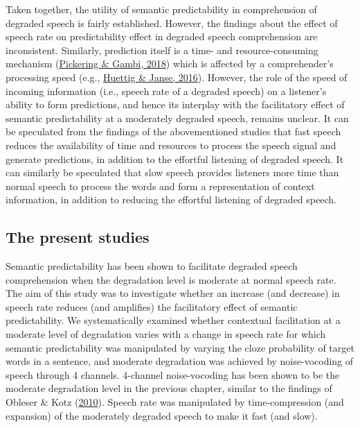 \documentclass[a4paper, nobind]{templates/ociamthesis}
\begin{document}
Taken together, the utility of semantic predictability in comprehension of degraded speech is fairly established.
However, the findings about the effect of speech rate on predictability effect in degraded speech comprehension are inconsistent.
Similarly, prediction itself is a time- and resource-consuming mechanism (\protect\hyperlink{ref-Pickering2018}{Pickering \& Gambi, 2018}) which is affected by a comprehender's processing speed (e.g., \protect\hyperlink{ref-Huettig2016a}{Huettig \& Janse, 2016}).
However, the role of the speed of incoming information (i.e., speech rate of a degraded speech) on a listener's ability to form predictions, and hence its interplay with the facilitatory effect of semantic predictability at a moderately degraded speech, remains unclear.
It can be speculated from the findings of the abovementioned studies that fast speech reduces the availability of time and resources to process the speech signal and generate predictions, in addition to the effortful listening of degraded speech.
It can similarly be speculated that slow speech provides listeners more time than normal speech to process the words and form a representation of context information, in addition to reducing the effortful listening of degraded speech.

\hypertarget{the-present-studies}{%
\subsection{The present studies}\label{the-present-studies}}

Semantic predictability has been shown to facilitate degraded speech comprehension when the degradation level is moderate at normal speech rate.
The aim of this study was to investigate whether an increase (and decrease) in speech rate reduces (and amplifies) the facilitatory effect of semantic predictability.
We systematically examined whether contextual facilitation at a moderate level of degradation varies with a change in speech rate for which
semantic predictability was manipulated by varying the cloze probability of target words in a sentence, and moderate degradation was achieved by noise-vocoding of speech through 4 channels.
4-channel noise-vocoding has been shown to be the moderate degradation level in the previous chapter, similar to the findings of Obleser \& Kotz (\protect\hyperlink{ref-Obleser2010}{2010}).
Speech rate was manipulated by time-compression (and expansion) of the moderately degraded speech to make it fast (and slow).
\end{document}
